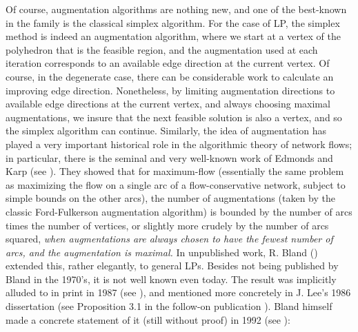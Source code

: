 \documentclass[moor]{informs1hack}              %
\begin{document}
Of course, augmentation algorithms are nothing new, and one of the best-known in the family is the classical  simplex algorithm. 
For the case of LP, the simplex method is indeed an augmentation algorithm, where
we start at a vertex of the polyhedron that is the feasible region,
and the augmentation used at each iteration corresponds to an available edge direction at the current vertex.
Of course, in the degenerate case, there can be considerable work to calculate an improving edge direction.
Nonetheless, by limiting augmentation directions to available edge directions at the current vertex, and always choosing maximal
augmentations, we insure that the next feasible solution is also a vertex, and so the simplex algorithm can continue.
Similarly, the idea of augmentation has played a very important historical role in the algorithmic theory of network flows; in particular, there is the seminal and very well-known work of  Edmonds and Karp (see \cite{edmondskarp}). They showed that for maximum-flow (essentially the same problem as maximizing the flow on a single arc of a flow-conservative network, subject to simple bounds on the other arcs), the number of augmentations (taken by the classic Ford-Fulkerson augmentation algorithm)
is bounded by the number of arcs times the number of vertices, or slightly more crudely by the number of arcs squared,
\emph{when augmentations are always chosen to have the fewest number of arcs, and the augmentation is maximal.}
In unpublished work, R. Bland (\cite{blandFlorida}) extended this, rather elegantly, to general LPs. Besides not being published
by Bland in the 1970's, it is not well known even today. The result was implicitly alluded to in print in 1987 (see \cite{BixMarTr}), and mentioned more concretely in J. Lee's 1986 dissertation \cite{LeeCornell} (see Proposition 3.1 in the follow-on publication \cite{LeeLAA}). Bland himself made a concrete statement of it (still without proof) in 1992  (see \cite{blandjensen}):
\end{document}
